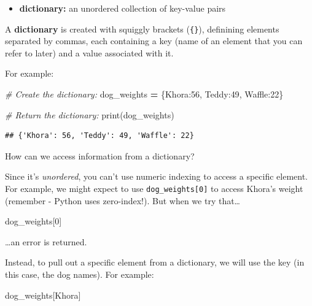 \documentclass[
]{book}
\newenvironment{Shaded}{\begin{snugshade}}{\end{snugshade}}
\newcommand{\BuiltInTok}[1]{#1}
\newcommand{\CommentTok}[1]{\textcolor[rgb]{0.56,0.35,0.01}{\textit{#1}}}
\newcommand{\DecValTok}[1]{\textcolor[rgb]{0.00,0.00,0.81}{#1}}
\newcommand{\NormalTok}[1]{#1}
\newcommand{\OperatorTok}[1]{\textcolor[rgb]{0.81,0.36,0.00}{\textbf{#1}}}
\newcommand{\StringTok}[1]{\textcolor[rgb]{0.31,0.60,0.02}{#1}}
\providecommand{\tightlist}{%
  \setlength{\itemsep}{0pt}\setlength{\parskip}{0pt}}
\begin{document}
\begin{itemize}
\tightlist
\item
  \textbf{dictionary:} an unordered collection of key-value pairs
\end{itemize}

A \textbf{dictionary} is created with squiggly brackets (\texttt{\{\}}), definining elements separated by commas, each containing a key (name of an element that you can refer to later) and a value associated with it.

For example:

\begin{Shaded}
\begin{Highlighting}[]

\CommentTok{\# Create the dictionary: }
\NormalTok{dog\_weights }\OperatorTok{=}\NormalTok{ \{}\StringTok{\textquotesingle{}Khora\textquotesingle{}}\NormalTok{:}\DecValTok{56}\NormalTok{, }\StringTok{\textquotesingle{}Teddy\textquotesingle{}}\NormalTok{:}\DecValTok{49}\NormalTok{, }\StringTok{\textquotesingle{}Waffle\textquotesingle{}}\NormalTok{:}\DecValTok{22}\NormalTok{\}}

\CommentTok{\# Return the dictionary:}
\BuiltInTok{print}\NormalTok{(dog\_weights) }
\end{Highlighting}
\end{Shaded}

\begin{verbatim}
## {'Khora': 56, 'Teddy': 49, 'Waffle': 22}
\end{verbatim}

How can we access information from a dictionary?

Since it's \emph{unordered}, you can't use numeric indexing to access a specific element. For example, we might expect to use \texttt{dog\_weights{[}0{]}} to access Khora's weight (remember - Python uses zero-index!). But when we try that\ldots{}

\begin{Shaded}
\begin{Highlighting}[]
\NormalTok{dog\_weights[}\DecValTok{0}\NormalTok{]}
\end{Highlighting}
\end{Shaded}

\ldots an error is returned.

Instead, to pull out a specific element from a dictionary, we will use the key (in this case, the dog names). For example:

\begin{Shaded}
\begin{Highlighting}[]
\NormalTok{dog\_weights[}\StringTok{\textquotesingle{}Khora\textquotesingle{}}\NormalTok{]}
\end{Highlighting}
\end{Shaded}
\end{document}
